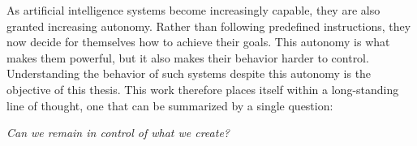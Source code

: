 As artificial intelligence systems become increasingly capable, they are also granted increasing autonomy.
Rather than following predefined instructions, they now decide for themselves how to achieve their goals.
This autonomy is what makes them powerful, but it also makes their behavior harder to control.
Understanding the behavior of such systems despite this autonomy is the objective of this thesis.
This work therefore places itself within a long-standing line of thought, one that can be summarized by a single question:
\begin{center}
\textit{Can we remain in control of what we create?}
\end{center}